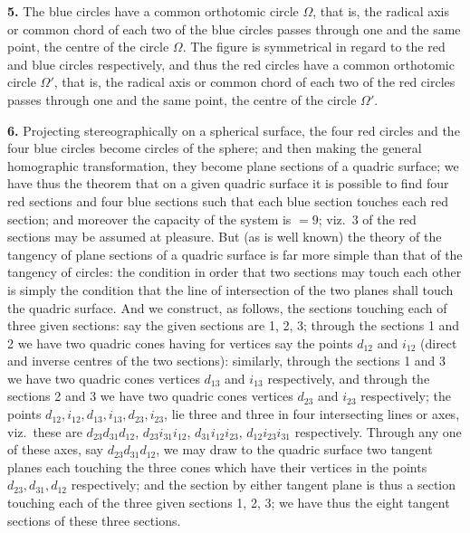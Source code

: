\documentclass[11pt]{article}
\begin{document}
\medskip
\noindent\textbf{5.} The blue circles have a common orthotomic circle $\Omega$, that is, the radical axis or common chord of each two of the blue circles passes through one and the same point, the centre of the circle $\Omega$. The figure is symmetrical in regard to the red and blue circles respectively, and thus the red circles have a common orthotomic circle $\Omega'$, that is, the radical axis or common chord of each two of the red circles passes through one and the same point, the centre of the circle $\Omega'$.

\medskip
\noindent\textbf{6.} Projecting stereographically on a spherical surface, the four red circles and the four blue circles become circles of the sphere; and then making the general homographic transformation, they become plane sections of a quadric surface; we have thus the theorem that on a given quadric surface it is possible to find four red sections and four blue sections such that each blue section touches each red section; and moreover the capacity of the system is $= 9$; viz.\ 3 of the red sections may be assumed at pleasure. But (as is well known) the theory of the tangency of plane sections of a quadric surface is far more simple than that of the tangency of circles: the condition in order that two sections may touch each other is simply the condition that the line of intersection of the two planes shall touch the quadric surface. And we construct, as follows, the sections touching each of three given sections: say the given sections are 1, 2, 3; through the sections 1 and 2 we have two quadric cones having for vertices say the points $d_{12}$ and $i_{12}$ (direct and inverse centres of the two sections): similarly, through the sections 1 and 3 we have two quadric cones vertices $d_{13}$ and $i_{13}$ respectively, and through the sections 2 and 3 we have two quadric cones vertices $d_{23}$ and $i_{23}$ respectively; the points $d_{12}, i_{12}, d_{13}, i_{13}, d_{23}, i_{23}$, lie three and three in four intersecting lines or axes, viz.\ these are $d_{23}d_{31}d_{12}$, $d_{23}i_{31}i_{12}$, $d_{31}i_{12}i_{23}$, $d_{12}i_{23}i_{31}$ respectively. Through any one of these axes, say $d_{23}d_{31}d_{12}$, we may draw to the quadric surface two tangent planes each touching the three cones which have their vertices in the points $d_{23}, d_{31}, d_{12}$ respectively; and the section by either tangent plane is thus a section touching each of the three given sections 1, 2, 3; we have thus the eight tangent sections of these three sections.
\end{document}
